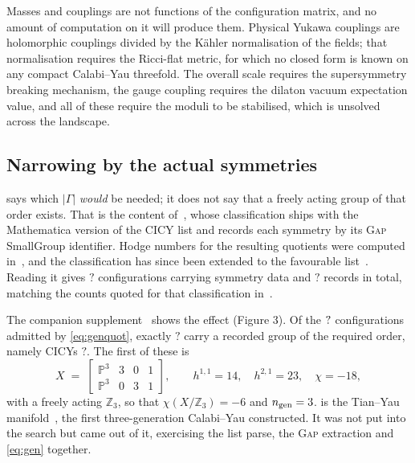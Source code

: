 \documentclass[11pt,a4paper]{article}
\newcommand{\FactGenWithSymmetry}{?}\newcommand{\FactGenRecords}{?}
\newcommand{\FactGenHits}{?}\newcommand{\FactGenMinEuler}{?}
\newcommand{\FactGenList}{?}
\newcommand{\PP}{\mathbb{P}}
\theoremstyle{definition}
\begin{document}
Masses and couplings are not functions of the configuration matrix, and no
amount of computation on it will produce them. Physical Yukawa couplings are
holomorphic couplings divided by the K\"ahler normalisation of the fields;
that normalisation requires the Ricci-flat metric, for which no closed form is
known on any compact Calabi--Yau threefold. The overall scale requires the
supersymmetry breaking mechanism, the gauge coupling requires the dilaton
vacuum expectation value, and all of these require the moduli to be
stabilised, which is unsolved across the landscape.

\subsection{Narrowing by the actual symmetries}
\label{sec:narrowing}

 says which $|\Gamma|$ \emph{would} be needed; it does not
say that a freely acting group of that order exists. That is the content
of~\cite{Braun2010}, whose classification ships with the Mathematica version
of the CICY list and records each symmetry by its \textsc{Gap} SmallGroup
identifier. Hodge numbers for the resulting quotients were computed
in~\cite{ConstantinGrayLukas2017,CandelasConstantinMishra2016}, and the
classification has since been extended to the favourable
list~\cite{GrayWang2022}. Reading it gives $\FactGenWithSymmetry$ configurations carrying
symmetry data and $\FactGenRecords$ records in total, matching the counts
quoted for that classification in~\cite{Braun2010,LukasMishra2020}.



The companion supplement~\cite{SuppFigures} shows the effect (Figure 3). Of the $?$
configurations admitted by \cref{eq:genquot}, exactly $\FactGenHits$ carry a
recorded group of the required order, namely CICYs $\FactGenList$. The first
of these is
%
\begin{equation}
X \;=\;
\begin{bmatrix}\PP^3 & 3 & 0 & 1\\ \PP^3 & 0 & 3 & 1\end{bmatrix},
\qquad h^{1,1} = 14, \quad h^{2,1} = 23, \quad \chi = -18,
\label{eq:tianyau}
\end{equation}
%
with a freely acting $\mathbb{Z}_3$, so that $\chi(X/\mathbb{Z}_3) = -6$ and
$n_{\rm gen} = 3$.  is the Tian--Yau
manifold~\cite{TianYau1987,CandelasIII}, the first three-generation
Calabi--Yau constructed. It was not put into the search but came out of it,
exercising the list parse, the \textsc{Gap} extraction and \cref{eq:gen} together.
\end{document}
